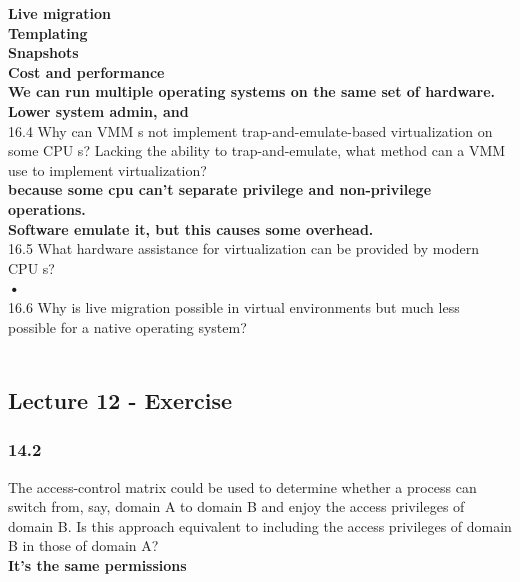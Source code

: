 \documentclass[a4paper,10pt,titlepage]{report}
\begin{document}
\hspace{10mm} \textbf{Live migration} \\


\hspace{10mm} \textbf{Templating} \\


\hspace{10mm} \textbf{Snapshots} \\


\hspace{10mm} \textbf{Cost and performance} \\

\hspace{10mm} \textbf{We can run multiple operating systems on the same set of hardware.} \\

\hspace{10mm} \textbf{Lower system admin, and } \\




16.4 Why can VMM s not implement trap-and-emulate-based virtualization on some CPU s? Lacking the ability to trap-and-emulate, what method can a VMM use to implement virtualization? \\
\hspace{10mm} \textbf{because some cpu can't separate privilege and non-privilege operations.} \\
\hspace{10mm} \textbf{Software emulate it, but this causes some overhead.} \\

16.5 What hardware assistance for virtualization can be provided by modern CPU s?\\
\hspace{10mm} \textbf{•} \\


16.6 Why is live migration possible in virtual environments but much less possible for a native operating system?\\
\hspace{10mm} \textbf{} \\



\subsection{Lecture 12 - Exercise}

\subsubsection{14.2} The access-control matrix could be used to determine whether a process can switch from, say, domain A to domain B and enjoy the access privileges of domain B. Is this approach equivalent to including the access privileges of domain B in those of domain A? 
\\ \hspace{10mm} \textbf{It's the same permissions} \\
\end{document}
